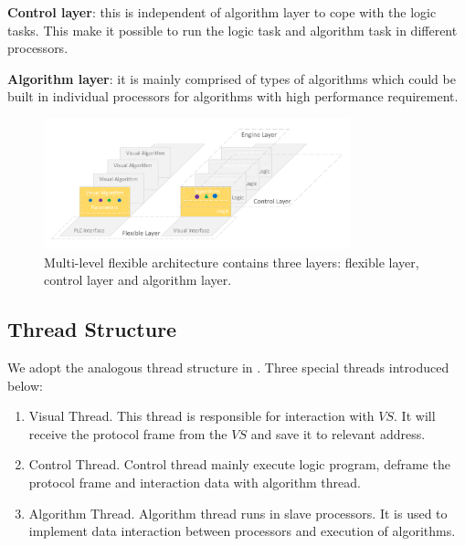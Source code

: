 \documentclass[journal,UTF8]{IEEEtran}
\begin{document}
\textbf{Control layer}: this is independent of algorithm layer to cope with the logic tasks. This make it possible to run the logic task and algorithm task in different processors.

\textbf{Algorithm layer}: it is mainly comprised of types of algorithms which could be built in individual processors for algorithms with high performance requirement. 


\begin{figure}
	\centering
	\includegraphics[width=3.5in]{fig/Software.pdf}
	\caption{Multi-level flexible architecture contains three layers: flexible layer, control layer and algorithm layer.}
	\label{fig:Software}
\end{figure}



\subsection{Thread Structure}
We adopt the analogous thread structure in \cite{wu2018customized}. Three special threads introduced below:
\begin{enumerate}
	\item Visual Thread. This thread is responsible for interaction with $VS$. It will receive the protocol frame from the $VS$ and save it to relevant address. 
	\item Control Thread. Control thread mainly execute logic program, deframe the protocol frame and interaction data with algorithm thread.
	\item Algorithm Thread. Algorithm thread runs in slave processors. It is used to implement data interaction between processors and execution of algorithms.
\end{enumerate}
\end{document}
